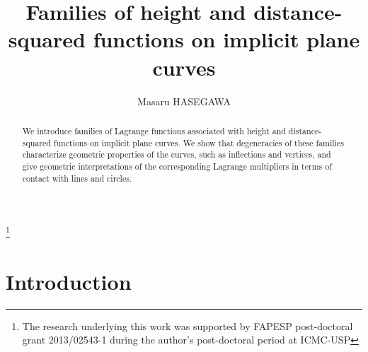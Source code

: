 \documentclass[12pt]{amsart}
\theoremstyle{plain}
\theoremstyle{definition}
\begin{document}
\title[Height and distance-squared functions on implicit plane curves]
{Families of height and distance-squared functions on implicit plane curves}

\author[M.~Hasegawa]
{Masaru HASEGAWA}

\address[Masaru Hasegawa]{%
Department of Information Science, Center for Liberal Arts and Sciences, Iwate Medical University,
1-1-1 Idaidori, Yahaba-cho, Shiwa-gun, Iwate 028-3694, Japan.}



\thanks{The research underlying this work was supported by FAPESP
post-doctoral grant 2013/02543-1 during the author's post-doctoral
period at ICMC-USP}


\allowdisplaybreaks[4]



\maketitle


\begin{abstract}
We introduce families of Lagrange functions associated with height and distance-squared functions on implicit plane curves. 
We show that degeneracies of these families characterize geometric properties of the curves, such as inflections and vertices, and give geometric interpretations of the corresponding Lagrange multipliers in terms of contact with lines and circles.
\end{abstract}


\section{Introduction}
\end{document}
